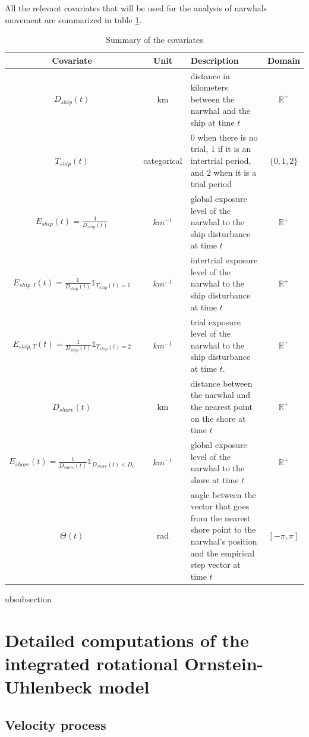 \documentclass[11pt]{article}
\newcommand {\R}{\mathbb{R}}
\newcommand {\1}{\mathbb{1}}
\begin{document}
 All the relevant covariates that will be used for the analysis of narwhals movement are summarized in table \ref{tab: covariates}.



\begin{table}[H]
	\centering
	\begin{tabular}{|c|c|p{8cm}|c|}
		\hline
		Covariate & Unit & Description & Domain \\
		\hline
		$D_{ship}(t)$ & km & distance in kilometers between the narwhal and the ship at time $t$ & $\R^+$ \\
		\hline
		$T_{ship}(t)$  & categorical & $0$ when there is no trial, $1$ if it is an intertrial period, and $2$ when it is a trial period & $\{0,1,2\}$\\
		\hline
		$E_{ship}(t)=\frac{1}{D_{ship}(t)}$ & $km^{-1}$ & global exposure level of the narwhal to the ship disturbance at time $t$ & $\R^+$ \\
		\hline
		$E_{ship,I}(t)=\frac{1}{D_{ship}(t)}\mathbb{1}_{T_{ship}(t)=1}$& $km^{-1}$ & intertrial exposure level of the narwhal to the ship disturbance at time $t$ & $\R^+$ \\
		\hline
		$E_{ship,T}(t)=\frac{1}{D_{ship}(t)}\mathbb{1}_{T_{ship}(t)=2}$ & $km^{-1}$ & trial exposure level of the narwhal to the ship disturbance at time $t$. & $\R^+$\\
		\hline
		$D_{shore}(t)$ & km & distance between the narwhal and the nearest point on the shore at time $t$ & $\R^+$ \\
		\hline
		$E_{shore}(t)=\frac{1}{D_{shore}(t)} \1_{D_{shore}(t)<D_0}$ & $km^{-1}$ & global exposure level of the narwhal to the shore at time $t$ & $\R^+$ \\
		\hline
		$\Theta(t)$ & rad & angle between the vector that goes from the nearest shore point to the narwhal's position and the empirical step vector at time $t$  & $[-\pi,\pi]$ \\
		\hline 
	\end{tabular}
	\caption{Summary of the covariates}ubsubsection
	\label{tab: covariates}
\end{table}


\section{Detailed computations of the integrated rotational Ornstein-Uhlenbeck model}
\label{section: detailed RACVM computations}

\subsection{Velocity process}
\end{document}
